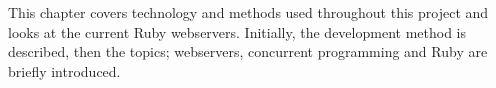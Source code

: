 This chapter covers technology and methods used throughout this project and
looks at the current Ruby webservers. Initially, the development method is
described, then the topics; webservers, concurrent programming and Ruby are
briefly introduced.
